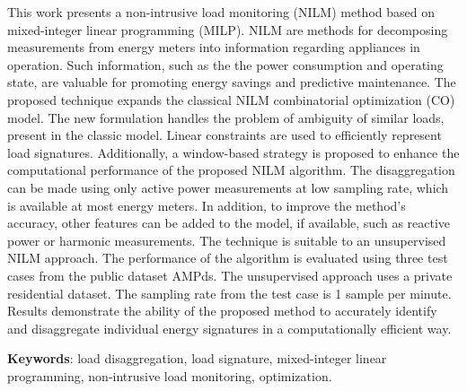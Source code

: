 This work presents a non-intrusive load monitoring (NILM) method based on mixed-integer linear programming (MILP). NILM are methods for decomposing measurements from energy meters into information regarding appliances in operation. Such information, such as the the power consumption and operating state, are valuable for promoting energy savings and predictive maintenance. The proposed technique expands the classical NILM combinatorial optimization (CO) model. The new formulation handles the problem of ambiguity of similar loads, present in the classic model. Linear constraints are used to efficiently represent load signatures. Additionally, a window-based strategy is proposed to enhance the computational performance of the proposed NILM algorithm. The disaggregation can be made using only active power measurements at low sampling rate, which is available at most energy meters. In addition, to improve the method's accuracy, other features can be added to the model, if available, such as reactive power or harmonic measurements. The technique is suitable to an unsupervised NILM approach. The performance of the algorithm is evaluated using three test cases from the public dataset AMPds. The unsupervised approach uses a private residential dataset. The sampling rate from the test case is 1 sample per minute. Results demonstrate the ability of the proposed method to accurately identify and disaggregate individual energy signatures in a computationally efficient way.


\vspace{.2cm}
\textbf{Keywords}:
load disaggregation, load signature, mixed-integer linear programming, non-intrusive load monitoring, optimization.